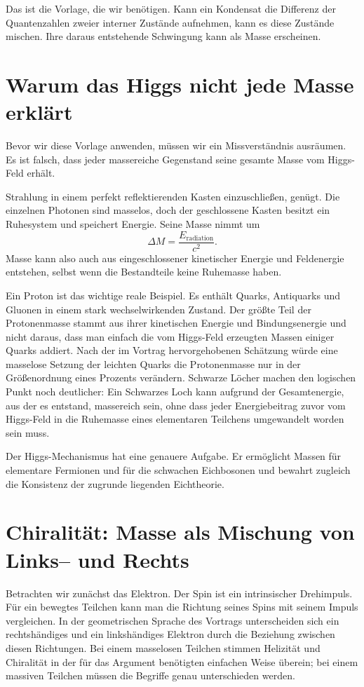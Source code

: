 Das ist die Vorlage, die wir benötigen. Kann ein Kondensat die Differenz der Quantenzahlen zweier interner Zustände aufnehmen, kann es diese Zustände mischen. Ihre daraus entstehende Schwingung kann als Masse erscheinen.

\section{Warum das Higgs nicht jede Masse erklärt}

Bevor wir diese Vorlage anwenden, müssen wir ein Missverständnis ausräumen. Es ist falsch, dass jeder massereiche Gegenstand seine gesamte Masse vom Higgs-Feld erhält.

Strahlung in einem perfekt reflektierenden Kasten einzuschließen, genügt. Die einzelnen Photonen sind masselos, doch der geschlossene Kasten besitzt ein Ruhesystem und speichert Energie. Seine Masse nimmt um
\begin{equation}
\Delta M=\frac{E_{\mathrm{radiation}}}{c^{2}}.
\end{equation}
Masse kann also auch aus eingeschlossener kinetischer Energie und Feldenergie entstehen, selbst wenn die Bestandteile keine Ruhemasse haben.

Ein Proton ist das wichtige reale Beispiel. Es enthält Quarks, Antiquarks und Gluonen in einem stark wechselwirkenden Zustand. Der größte Teil der Protonenmasse stammt aus ihrer kinetischen Energie und Bindungsenergie und nicht daraus, dass man einfach die vom Higgs-Feld erzeugten Massen einiger Quarks addiert. Nach der im Vortrag hervorgehobenen Schätzung würde eine masselose Setzung der leichten Quarks die Protonenmasse nur in der Größenordnung eines Prozents verändern. Schwarze Löcher machen den logischen Punkt noch deutlicher: Ein Schwarzes Loch kann aufgrund der Gesamtenergie, aus der es entstand, massereich sein, ohne dass jeder Energiebeitrag zuvor vom Higgs-Feld in die Ruhemasse eines elementaren Teilchens umgewandelt worden sein muss.

Der Higgs-Mechanismus hat eine genauere Aufgabe. Er ermöglicht Massen für elementare Fermionen und für die schwachen Eichbosonen und bewahrt zugleich die Konsistenz der zugrunde liegenden Eichtheorie.

\section{Chiralität: Masse als Mischung von Links-- und Rechts}

Betrachten wir zunächst das Elektron. Der Spin ist ein intrinsischer Drehimpuls. Für ein bewegtes Teilchen kann man die Richtung seines Spins mit seinem Impuls vergleichen. In der geometrischen Sprache des Vortrags unterscheiden sich ein rechtshändiges und ein linkshändiges Elektron durch die Beziehung zwischen diesen Richtungen. Bei einem masselosen Teilchen stimmen Helizität und Chiralität in der für das Argument benötigten einfachen Weise überein; bei einem massiven Teilchen müssen die Begriffe genau unterschieden werden.


